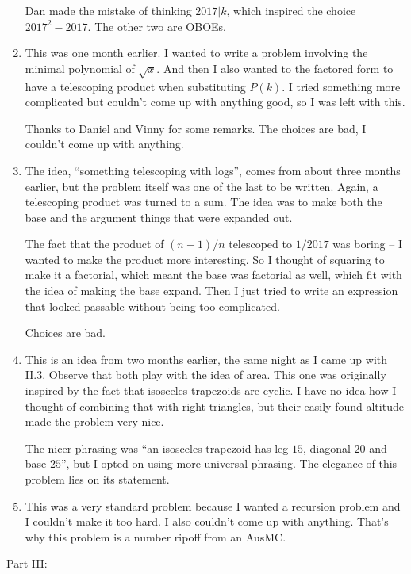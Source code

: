 \documentclass[10pt,paper=letter]{scrartcl}
\begin{document}
\begin{enumerate}
  Dan made the mistake of thinking $2017|k$, which inspired the choice $2017^2 - 2017$. The other two are OBOEs.

  \item This was one month earlier. I wanted to write a problem involving the minimal polynomial of $\sqrt{x}$. And then I also wanted to the factored form to have a telescoping product when substituting $P(k)$. I tried something more complicated but couldn't come up with anything good, so I was left with this.

  Thanks to Daniel and Vinny for some remarks. The choices are bad, I couldn't come up with anything.

  \item The idea, ``something telescoping with logs'', comes from about three months earlier, but the problem itself was one of the last to be written. Again, a telescoping product was turned to a sum. The idea was to make both the base and the argument things that were expanded out.

  The fact that the product of $(n-1)/n$ telescoped to $1/2017$ was boring -- I wanted to make the product more interesting. So I thought of squaring to make it a factorial, which meant the base was factorial as well, which fit with the idea of making the base expand. Then I just tried to write an expression that looked passable without being too complicated.

  Choices are bad.

  \item This is an idea from two months earlier, the same night as I came up with II.3. Observe that both play with the idea of area. This one was originally inspired by the fact that isosceles trapezoids are cyclic. I have no idea how I thought of combining that with right triangles, but their easily found altitude made the problem very nice.

  The nicer phrasing was ``an isosceles trapezoid has leg $15$, diagonal $20$ and base $25$'', but I opted on using more universal phrasing. The elegance of this problem lies on its statement.

  \item This was a very standard problem because I wanted a recursion problem and I couldn't make it too hard. I also couldn't come up with anything. That's why this problem is a number ripoff from an AusMC.
\end{enumerate}

Part III:
\end{document}

